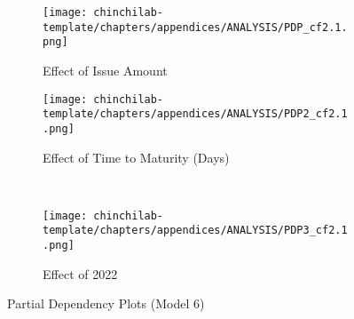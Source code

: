 \begin{figure}[H]
\centering
   \begin{subfigure}[b]{0.45\textwidth}
    \texttt{[image: chinchilab-template/chapters/appendices/ANALYSIS/PDP\_cf2.1.png]}
    \caption{Effect of Issue Amount}
   \label{fig:Ng1} 
\end{subfigure}
\begin{subfigure}[b]{0.45\textwidth}
    \texttt{[image: chinchilab-template/chapters/appendices/ANALYSIS/PDP2\_cf2.1.png]}
    \caption{Effect of Time to Maturity (Days)}
   \label{fig:Ng2}
\end{subfigure}
\\
\begin{subfigure}[b]{0.45\textwidth}
    \texttt{[image: chinchilab-template/chapters/appendices/ANALYSIS/PDP3\_cf2.1.png]}
    \caption{Effect of 2022}
   \label{fig:Ng2}
\end{subfigure}
\caption{Partial Dependency Plots (Model 6)}
\end{figure}

